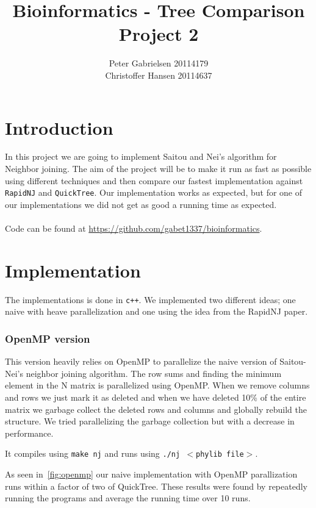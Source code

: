 \documentclass[a4paper,oneside,article,11pt]{memoir}
\title{Bioinformatics - Tree Comparison \\ Project 2}
\author{Peter Gabrielsen 20114179\\
Christoffer Hansen 20114637}
\begin{document}
\maketitle

\chapter*{Introduction}
In this project we are going to implement Saitou and Nei's algorithm for Neighbor joining. The aim of the project will be to make it run as fast as possible using different techniques and then compare our fastest implementation against \texttt{RapidNJ} and \texttt{QuickTree}.
Our implementation works as expected, but for one of our implementations we did not get as good a running time as expected.
\\\\Code can be found at \url{https://github.com/gabet1337/bioinformatics}.

\pagebreak

\chapter*{Implementation}
The implementations is done in \texttt{c++}. 
We implemented two different ideas; one naive with heave parallelization and one using the idea from the RapidNJ paper.

\subsection*{OpenMP version}
This version heavily relies on OpenMP to parallelize the naive version of Saitou-Nei's neighbor joining algorithm. The row sums and finding the minimum element in the N matrix is parallelized using OpenMP. When we remove columns and rows we just mark it as deleted and when we have deleted 10\% of the entire matrix we garbage collect the deleted rows and columns and globally rebuild the structure. We tried parallelizing the garbage collection but with a decrease in performance.

It compiles using \texttt{make nj} and runs using \texttt{./nj $<$phylib file$>$}.

As seen in~\ref{fig:openmp} our naive implementation with OpenMP parallization runs within a factor of two of QuickTree. These results were found by repeatedly running the programs and average the running time over 10 runs.
\end{document}
